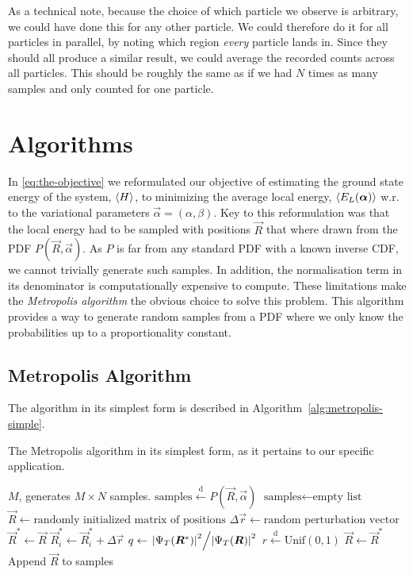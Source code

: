 \documentclass[a4paper, 11pt]{article}
\newcommand{\setfrom}{\overset{\mathrm{d}}{\leftarrow}}
\begin{document}
\begin{multicols}{2}
As a technical note, because the choice of which particle we observe is
arbitrary, we could have done this for any other particle. We could therefore do
it for all particles in parallel, by noting which region \textit{every} particle
lands in. Since they should all produce a similar result, we could average the
recorded counts across all particles. This should be roughly the same as if we
had $N$ times as many samples and only counted for one particle.


\section{Algorithms}
In \eqref{eq:the-objective} we reformulated our objective of estimating the ground state energy of the
system, $\expval{H}$, to minimizing the average local energy, $\expval{E_L(\bm\alpha)}$ w.r. to
the variational parameters $\vec \alpha = (\alpha, \beta)$. Key to this
reformulation was that the local energy had to be sampled with positions $\vec
R$ that where drawn from the PDF $P(\vec R, \vec\alpha)$. As $P$ is far from any
standard PDF with a known inverse CDF, we cannot trivially generate such
samples. In addition, the normalisation term in its denominator is
computationally expensive to compute. These limitations make the
\textit{Metropolis algorithm} the obvious choice to solve this problem. This
algorithm provides a way to generate random samples from a PDF where we only
know the probabilities up to a proportionality constant.

\subsection{Metropolis Algorithm}
The algorithm in its
simplest form is described in Algorithm~\ref{alg:metropolis-simple}.

\begin{algorithm}[H]
    \caption{The Metropolis algorithm in its simplest form, as it
    pertains to our specific application.}
    \label{alg:metropolis-simple}
    \begin{algorithmic}[1]
        \REQUIRE $M$, generates $M\times N$ samples.
        \ENSURE $\text{samples} \setfrom P(\vec R, \vec\alpha)$
        \STATE $\text{samples} \leftarrow \text{empty list}$
        \STATE $\vec R \leftarrow \text{randomly initialized matrix of positions}$
                \STATE $\Delta \vec{r} \leftarrow \text{random perturbation vector}$
                \STATE $\vec R^*\leftarrow \vec R $
                \STATE $\vec R^*_i \leftarrow \vec R^{*}_i+ \Delta \vec{r}$ 
                \STATE $q \leftarrow \flatfrac{\abs{\Psi_T(\vec R^*)}^2}{\abs{\Psi_T(\vec R)}^2}$
                \STATE $r \setfrom \text{Unif}(0, 1)$
                    \STATE $\vec R \leftarrow \vec R^*$
                \ENDIF
                \STATE Append $\vec R$ to samples
            \ENDFOR
        \ENDFOR
    \end{algorithmic}
\end{algorithm}


\end{multicols}
\end{document}

